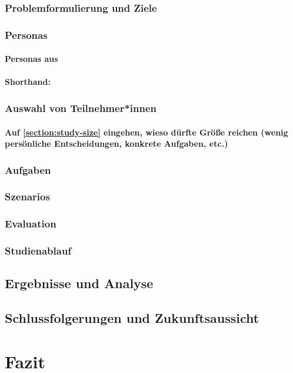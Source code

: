 \documentclass[a4paper, 12pt, oneside, BCOR=1cm,toc=chapterentrywithdots]{scrbook}
\begin{document}
\subsection{Problemformulierung und Ziele}
\subsection{Personas}
\subsubsection{Personas aus }
\subsubsection{Shorthand: }
\subsection{Auswahl von Teilnehmer*innen}
\subsubsection{Auf \ref{section:study-size} eingehen, wieso dürfte Größe reichen (wenig persönliche Entscheidungen, konkrete Aufgaben, etc.)}
\subsection{Aufgaben}
\subsection{Szenarios}
\subsection{Evaluation}
\subsection{Studienablauf}
\section{Ergebnisse und Analyse}
\section{Schlussfolgerungen und Zukunftsaussicht}

\chapter{Fazit}
\end{document}
